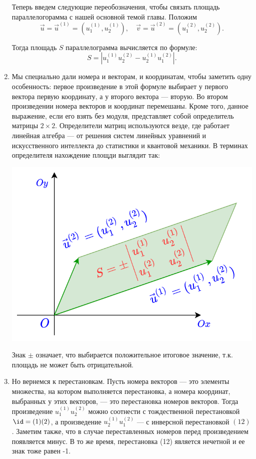 \begin{enumerate}
Теперь введем следующие переобозначения, чтобы связать площадь параллелогорамма с нашей основной темой главы. Положим
$$
\vec u = \vec u^{(1)} = (u^{(1)}_1,u^{(1)}_2), \quad \vec v = \vec u^{(2)} = (u^{(2)}_1,u^{(2)}_2).
$$

Тогда площадь $S$ параллелограмма вычисляется по формуле:
$$
S=\left|u^{(1)}_1u^{(2)}_2-u^{(1)}_2u^{(2)}_1\right|.
$$

\item Мы специально дали номера и векторам, и координатам, чтобы заметить одну особенность: первое произведение в этой формуле выбирает у первого вектора первую координату, а у второго вектора --- вторую. Во втором произведении номера векторов и координат перемешаны. Кроме того, данное выражение, если его взять без модуля, представляет собой определитель матрицы $2\times 2$. Определители матриц используются везде, где работает линейная алгебра --- от решения систем линейных уравнений и искусственного интеллекта до статистики и квантовой механики. В терминах определителя нахождение площди выглядит так:
\begin{center}
\includegraphics[scale=0.4]{paralel2.png}
\end{center}
Знак $\pm$ означает, что выбирается положительное итоговое значение, т.к. площадь не может быть отрицательной.
\item Но вернемся к перестановкам. Пусть номера векторов --- это элементы множества, на котором выполняется перестановка, а номера координат, выбранных у этих векторов, --- это перестановка номеров векторов. Тогда произведение $u^{(1)}_1u^{(2)}_2$ можно соотнести с тождественной перестановкой $\id=(1)(2)$, а произведение $u^{(1)}_2u^{(2)}_1$ --- с инверсной перестановкой $(12)$. Заметим также, что в случае переставленных номеров перед произведением появляется минус. В то же время, перестановка (12) является нечетной и ее знак тоже равен -1.

\end{enumerate}
